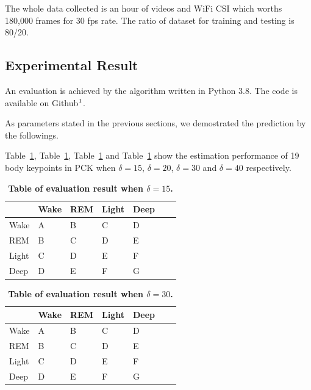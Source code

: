 \documentclass[10pt,letterpaper]{article}
\begin{document}
	The whole data collected is an hour of videos and WiFi CSI which worths 180,000 frames for 30 fps rate. The ratio of dataset for training and testing is 80/20.
	
	\subsection*{Experimental Result}
	\label{result}	
	
	An evaluation is achieved   by the algorithm written in Python 3.8. The code is available on 	Github$\footnote[1]{https://github.com/rtmtree/CSPS}$.
	
	As parameters stated in the previous sections, we demostrated the prediction by the followings.
	
	Table~\ref{table:resultSigma15}, Table~\ref{table:resultSigma15}, Table~\ref{table:resultSigma15} and  Table~\ref{table:resultSigma15} show the estimation performance of 19 body keypoints in PCK when $\delta=15$, $\delta=20$, $\delta=30$ and $\delta=40$ respectively.
\begin{table}[!ht]
	\begin{adjustwidth}{-2.25in}{0in} %
		\centering
		\caption{
			{\bf Table of evaluation result when $\delta=15$.}}
	\begin{tabular}{l|llllll}
	 &Wake & REM &Light &Deep \\[1pt]
	\hline
	Wake &A &B &C &D \\[1pt]
	REM &B &C &D &E \\[1pt]
	Light &C &D &E &F \\[1pt]
	Deep &D &E &F &G \\[1pt]
\end{tabular}
	\label{table:resultSigma15}
\end{adjustwidth}
\end{table}

\begin{table}[!ht]
	\begin{adjustwidth}{-2.25in}{0in} %
		\centering
		\caption{
			{\bf Table of evaluation result when $\delta=30$.}}
		\begin{tabular}{l|llllll}
			&Wake & REM &Light &Deep \\[1pt]
			\hline
			Wake &A &B &C &D \\[1pt]
			REM &B &C &D &E \\[1pt]
			Light &C &D &E &F \\[1pt]
			Deep &D &E &F &G \\[1pt]
		\end{tabular}
		\label{table:resultSigma30}
	\end{adjustwidth}
\end{table}
\end{document}

